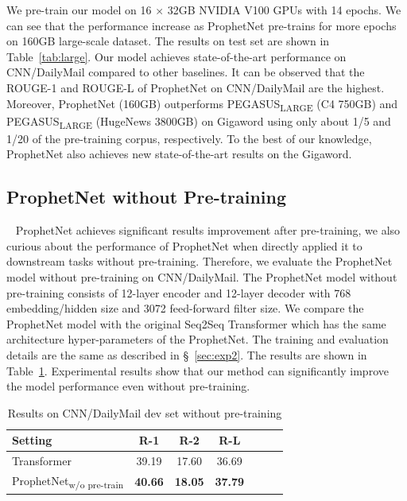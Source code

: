 \documentclass[11pt,a4paper]{article}
\begin{document}
We pre-train our model on 16 $\times$ 32GB NVIDIA V100 GPUs with 14 epochs.  We can see that the performance increase as ProphetNet pre-trains for more epochs on 160GB large-scale dataset.  The results on test set are shown in Table~\ref{tab:large}.   
Our model achieves state-of-the-art performance on CNN/DailyMail compared to other baselines.
It can be observed that the ROUGE-1 and ROUGE-L of ProphetNet on CNN/DailyMail are the highest.
Moreover, ProphetNet (160GB) outperforms PEGASUS\textsubscript{LARGE} (C4 750GB) and PEGASUS\textsubscript{LARGE} (HugeNews 3800GB) on Gigaword using only about 1/5 and 1/20 of the pre-training corpus, respectively. To the best of our knowledge, ProphetNet also achieves new state-of-the-art results on the Gigaword. 

\subsection{ProphetNet without Pre-training}~\label{sec:exp5}
ProphetNet achieves significant results improvement after pre-training, we also curious about the performance of ProphetNet when directly applied it to downstream tasks without pre-training.
Therefore, we evaluate the ProphetNet model without pre-training on CNN/DailyMail.
The ProphetNet model without pre-training consists of 12-layer encoder and 12-layer decoder with 768 embedding/hidden size and 3072 feed-forward filter size.
We compare the ProphetNet model with the original Seq2Seq Transformer which has the same architecture hyper-parameters of the ProphetNet.
The training and evaluation details are the same as described in \S~\ref{sec:exp2}.
The results are shown in Table~\ref{tab:nopretrain}.
Experimental results show that our method can significantly improve the model performance even without pre-training.
\begin{table}[h] 
\small
\begin{center}
\begin{tabular}{lcccccl}
\toprule
    Setting & R-1 & R-2 & R-L \\
    \midrule
 Transformer\scriptsize{~\cite{raffel2019exploring}} & 39.19    &17.60&   36.69\\
 ProphetNet\textsubscript{w/o pre-train} & \textbf{40.66}    & \textbf{18.05} & \textbf{37.79}\\
  \bottomrule
\end{tabular}
\end{center}
\caption{Results on CNN/DailyMail dev set without pre-training}
\label{tab:nopretrain}
\end{table}
\end{document}
